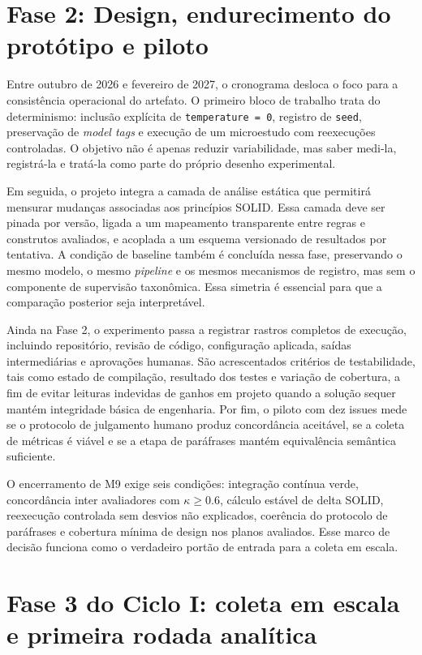 \documentclass[12pt,a4paper]{article}
\begin{document}
\section{Fase 2: Design, endurecimento do protótipo e piloto}

Entre outubro de 2026 e fevereiro de 2027, o cronograma desloca o foco para a consistência operacional do artefato. O primeiro bloco de trabalho trata do determinismo: inclusão explícita de \texttt{temperature = 0}, registro de \texttt{seed}, preservação de \textit{model tags} e execução de um microestudo com reexecuções controladas. O objetivo não é apenas reduzir variabilidade, mas saber medi-la, registrá-la e tratá-la como parte do próprio desenho experimental.

Em seguida, o projeto integra a camada de análise estática que permitirá mensurar mudanças associadas aos princípios SOLID. Essa camada deve ser pinada por versão, ligada a um mapeamento transparente entre regras e construtos avaliados, e acoplada a um esquema versionado de resultados por tentativa. A condição de baseline também é concluída nessa fase, preservando o mesmo modelo, o mesmo \textit{pipeline} e os mesmos mecanismos de registro, mas sem o componente de supervisão taxonômica. Essa simetria é essencial para que a comparação posterior seja interpretável.

Ainda na Fase 2, o experimento passa a registrar rastros completos de execução, incluindo repositório, revisão de código, configuração aplicada, saídas intermediárias e aprovações humanas. São acrescentados critérios de testabilidade, tais como estado de compilação, resultado dos testes e variação de cobertura, a fim de evitar leituras indevidas de ganhos em projeto quando a solução sequer mantém integridade básica de engenharia. Por fim, o piloto com dez issues mede se o protocolo de julgamento humano produz concordância aceitável, se a coleta de métricas é viável e se a etapa de paráfrases mantém equivalência semântica suficiente.

O encerramento de M9 exige seis condições: integração contínua verde, concordância inter avaliadores com $\kappa \geq 0.6$, cálculo estável de delta SOLID, reexecução controlada sem desvios não explicados, coerência do protocolo de paráfrases e cobertura mínima de design nos planos avaliados. Esse marco de decisão funciona como o verdadeiro portão de entrada para a coleta em escala.

\section{Fase 3 do Ciclo I: coleta em escala e primeira rodada analítica}
\end{document}
